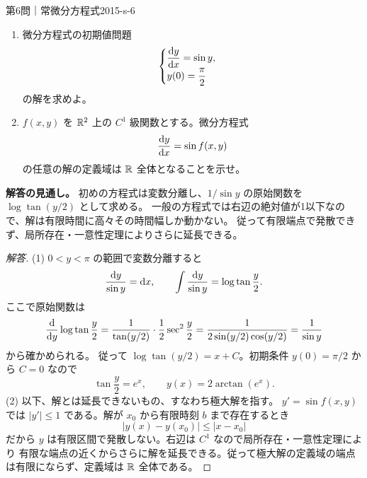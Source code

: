 \begin{problem}{第6問｜常微分方程式}{2015-s-6}
\begin{enumerate}
  \item[(1)] 微分方程式の初期値問題
  \[
  \begin{cases}
  \dfrac{\mathrm{d} y}{\mathrm{d} x}=\sin y,\\[1mm]
  y(0)=\dfrac\pi2
  \end{cases}
  \]
  の解を求めよ。
  \item[(2)] $f(x,y)$ を $\mathbb{R}^2$ 上の $C^1$ 級関数とする。微分方程式
  \[
  \frac{\mathrm{d} y}{\mathrm{d} x}=\sin f(x,y)
  \]
  の任意の解の定義域は $\mathbb{R}$ 全体となることを示せ。
\end{enumerate}
\end{problem}
\begin{memo*}
\textbf{解答の見通し。}
初めの方程式は変数分離し、$1/\sin y$ の原始関数を
$\log\tan(y/2)$ として求める。
一般の方程式では右辺の絶対値が1以下なので、解は有限時間に高々その時間幅しか動かない。
従って有限端点で発散できず、局所存在・一意性定理によりさらに延長できる。
\end{memo*}
\begin{proof}[解答]
(1) $0<y<\pi$ の範囲で変数分離すると
\[
\frac{\mathrm{d} y}{\sin y}=\mathrm{d} x,\qquad
\int\frac{\mathrm{d} y}{\sin y}=\log\tan\frac y2.
\]
ここで原始関数は
\[
\frac{\mathrm{d}}{\mathrm{d} y}\log\tan\frac y2
=\frac{1}{\tan(y/2)}\cdot\frac12\sec^2\frac y2
=\frac1{2\sin(y/2)\cos(y/2)}
=\frac1{\sin y}
\]
から確かめられる。
従って $\log\tan(y/2)=x+C$。初期条件 $y(0)=\pi/2$ から $C=0$ なので
\[
\tan\frac y2=e^x,\qquad y(x)=2\arctan(e^x).
\]
(2) 以下、解とは延長できないもの、すなわち極大解を指す。
$y'=\sin f(x,y)$ では $|y'|\le1$ である。解が $x_0$ から有限時刻 $b$ まで存在するとき
\[
|y(x)-y(x_0)|\le|x-x_0|
\]
だから $y$ は有限区間で発散しない。右辺は $C^1$ なので局所存在・一意性定理により
有限な端点の近くからさらに解を延長できる。従って極大解の定義域の端点は有限にならず、定義域は $\mathbb{R}$ 全体である。
\end{proof}

